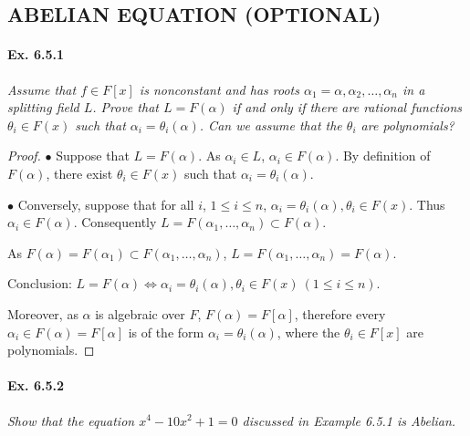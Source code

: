 \documentclass[11pt,a4paper]{article}
\begin{document}
\subsection{ABELIAN EQUATION (OPTIONAL)}
\paragraph{Ex. 6.5.1}

{\it Assume that $f\in F[x]$ is nonconstant and has roots $\alpha_1 = \alpha,\alpha_2,\ldots,\alpha_n$ in a splitting field $L$. Prove that $L = F(\alpha)$ if and only if there are rational functions $\theta_i \in F(x)$ such that $\alpha_i = \theta_i(\alpha)$. Can we assume that the $\theta_i$ are polynomials?
}

\begin{proof}

$\bullet$ Suppose that $L=F(\alpha)$. As $\alpha_i \in L$, $\alpha_i \in F(\alpha)$. By definition of $F(\alpha)$, there exist $\theta_i \in F(x)$ such that $\alpha_i = \theta_i(\alpha)$.

$\bullet$ Conversely, suppose that for all $i$, $1\leq i \leq n$, $\alpha_i = \theta_i(\alpha), \theta_i \in F(x)$.
Thus $\alpha_i\in F(\alpha)$. Consequently $L=F(\alpha_1,\ldots,\alpha_n)\subset F(\alpha)$. 

As $F(\alpha) = F(\alpha_1)\subset F(\alpha_1,\ldots,\alpha_n)$, $L =F(\alpha_1,\ldots,\alpha_n) = F(\alpha)$.

Conclusion: $L=F(\alpha) \iff \alpha_i = \theta_i(\alpha), \theta_i \in F(x)\  (1\leq i \leq n)$.

Moreover, as $\alpha$ is algebraic over $F$, $F(\alpha) = F[\alpha]$, therefore every $\alpha_i \in F(\alpha) = F[\alpha]$ is of the form $\alpha_i = \theta_i(\alpha)$, where the $\theta_i \in F[x]$ are polynomials.
\end{proof}

\paragraph{Ex. 6.5.2}

{\it Show that the equation $x^4-10x^2+1 = 0$ discussed in Example 6.5.1 is Abelian.
}
\end{document}
